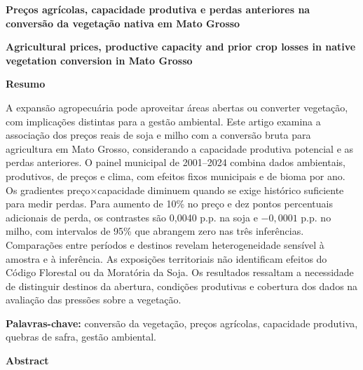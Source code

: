 \begin{center}
\textbf{Preços agrícolas, capacidade produtiva e perdas anteriores na conversão da vegetação nativa em Mato Grosso}

\vspace{0.4cm}
\textbf{Agricultural prices, productive capacity and prior crop losses in native vegetation conversion in Mato Grosso}
\end{center}

\vspace{0.5cm}
\noindent\textbf{Resumo}

\vspace{0.3cm}
A expansão agropecuária pode aproveitar áreas abertas ou converter vegetação, com implicações distintas para a gestão ambiental. Este artigo examina a associação dos preços reais de soja e milho com a conversão bruta para agricultura em Mato Grosso, considerando a capacidade produtiva potencial e as perdas anteriores. O painel municipal de 2001--2024 combina dados ambientais, produtivos, de preços e clima, com efeitos fixos municipais e de bioma por ano. Os gradientes preço×capacidade diminuem quando se exige histórico suficiente para medir perdas. Para aumento de 10\% no preço e dez pontos percentuais adicionais de perda, os contrastes são 0,0040 p.p. na soja e $-0,0001$ p.p. no milho, com intervalos de 95\% que abrangem zero nas três inferências. Comparações entre períodos e destinos revelam heterogeneidade sensível à amostra e à inferência. As exposições territoriais não identificam efeitos do Código Florestal ou da Moratória da Soja. Os resultados ressaltam a necessidade de distinguir destinos da abertura, condições produtivas e cobertura dos dados na avaliação das pressões sobre a vegetação.

\vspace{0.4cm}
\noindent\textbf{Palavras-chave:} conversão da vegetação, preços agrícolas, capacidade produtiva, quebras de safra, gestão ambiental.

\vspace{0.6cm}
\noindent\textbf{Abstract}

